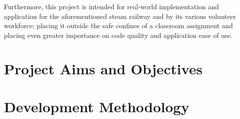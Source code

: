 Furthermore, this project is intended for real-world implementation and application for the aforementioned steam railway and by its various volunteer workforce; placing it outside the safe confines of a classroom assignment and placing even greater importance on code quality and application ease of use.

\section{Project Aims and Objectives}

\section{Development Methodology}

